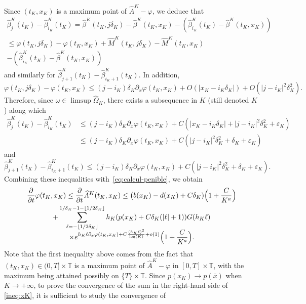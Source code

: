 \documentclass[JEP,XML,SOM,Unicode,published]{cedram}
\theoremstyle{plain}
\theoremstyle{remark}
\newcommand\T{\mathbb{T}}
\begin{document}
Since $(t_K,x_K)$ is a maximum point of $\widehat A^K-\varphi$, we deduce that
\begin{multline*}
\widehat \beta_j^K(t_K)-\widehat\beta_{i_K}^K(t_K)=\widehat{\beta}^K(t_K,j\delta_K)-\widehat{\beta}^K(t_K,x_K)-\left(\widehat\beta_{i_K}^K(t_K)-\widehat{\beta}^K(t_K,x_K)\right) \\
\leq\varphi(t_K,j\delta_K)-\varphi(t_K,x_K)+\widehat{M}^K(t_K,j\delta_K)-\widehat{M}^K(t_K,x_K)\\
-\left(\widehat\beta_{i_K}^K(t_K)-\widehat{\beta}^K(t_K,x_K)\right)
\end{multline*}
and similarly for $\widehat \beta_{j+1}^K(t_K)- \widehat\beta_{i_K+1}^K(t_K)$.
In addition,
\[
\varphi(t_K,j\delta_K)- \varphi(t_K,x_K)
\leq (j-i_K)\delta_K\partial_x \varphi(t_K,x_K)+O(|x_K-i_K\delta_K|)+O(|j-i_K|^2\delta_K^2).
\]
Therefore, since $\omega\in\limsup \widehat{\Omega}_K$, there exists a subsequence in $K$ (still denoted $K$) along which
\begin{align*}
\widehat\beta_j^K(t_K)-\widehat\beta_{i_K}^K(t_K) & \leq (j-i_K)\delta_K\partial_x \varphi(t_K,x_K)+C\left(|x_K-i_K\delta_K|+|j-i_K|^2\delta_K^2+\varepsilon_K\right) \\ & \leq (j-i_K)\delta_K\partial_x \varphi(t_K,x_K)+C (|j-i_K|^2\delta_K^2+\delta_K+\varepsilon_K)
\end{align*}
and
\[
\widehat\beta_{j+1}^K(t_K)-\widehat\beta_{i_K+1}^K(t_K)\leq (j-i_K)\delta_K\partial_x \varphi(t_K,x_K) +C(|j-i_K|^2\delta_K^2+\delta_K+\varepsilon_K).
\]
Combining these inequalities with~\eqref{eq:calcul-penible}, we obtain
\begin{multline}\label{ineq:xK}
\frac{\partial}{\partial t}\varphi(t_K,x_K) \leq\frac{\partial}{\partial t} \widehat A^K(t_K,x_K)
\leq \big(b(x_K)-d(x_K)+C\delta_K) \Bigl(1+\frac{C}{K^a} \Bigr)\\
+\sum_{\ell=-\lfloor 1/2\delta_K\rfloor}^{1/\delta_K-1-\lfloor 1/2\delta_K\rfloor}h_K (p(x_K)+C\delta_K(|\ell|+1)) G(h_K\ell) \\[-5pt]
\times
e^{h_K\ell\partial_x\varphi(t_K,x_K)+C\frac{(h_K\ell)^2}{\log(K)}+o(1)} \Bigl(1+\frac{C}{K^a} \Bigl).
\end{multline}
Note that the first inequality above comes from the fact that $(t_K,x_K)\in (0,T]\times \T $ is a maximum point of $\widehat A^K-\varphi$ in $[0,T]\times \T$, with the maximum being attained possibly on $\{T\}\times \T$.
Since $p(x_K)\to p(\bar{x})$ when $K\to+\infty$, to prove the convergence of the sum in the right-hand side of \eqref{ineq:xK}, it is sufficient to study the convergence of
\end{document}
